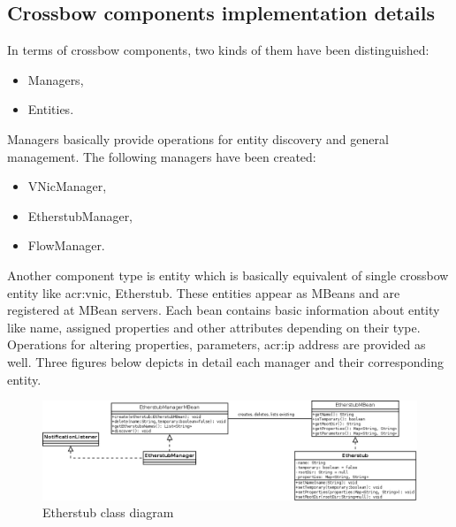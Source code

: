 \documentclass[11pt]{book}
\begin{document}
		\subsection{Crossbow components implementation details}
			\label{sec:impl:comp}
	
		In terms of crossbow components, two kinds of them have been distinguished:

		\begin{itemize}
			\item Managers,
			\item Entities.
		\end{itemize}

		Managers basically provide operations for entity discovery and general management. The following managers have
		been created:

		\begin{itemize}
			\item VNicManager,
			\item EtherstubManager,
			\item FlowManager.
		\end{itemize}

    Another component type is entity which is basically equivalent of single crossbow entity like \gls{acr:vnic},
    Etherstub. These entities appear as MBeans and are registered at MBean servers. Each bean contains basic information
    about entity like name, assigned properties and other attributes depending on their type. Operations for altering
    properties, parameters, \gls{acr:ip} address are provided as well. Three figures below depicts in detail each
    manager and their corresponding entity.

        \begin{figure}[H]
          \begin{center}
            \includegraphics[width=1.2\textwidth, angle=90]{img/impl/etherstub.png}
          \end{center}
          \caption{Etherstub class diagram}
        \end{figure}        
\end{document}
